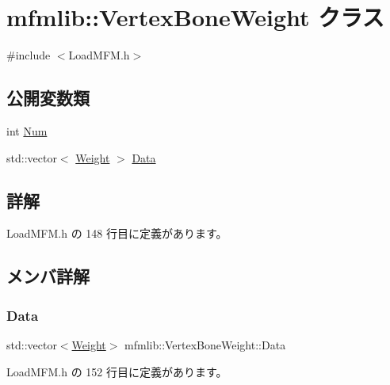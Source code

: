 \hypertarget{classmfmlib_1_1_vertex_bone_weight}{}\section{mfmlib\+:\+:Vertex\+Bone\+Weight クラス}
\label{classmfmlib_1_1_vertex_bone_weight}


{\ttfamily \#include $<$Load\+M\+F\+M.\+h$>$}

\subsection*{公開変数類}
\begin{DoxyCompactItemize}
\item 
int \mbox{\hyperlink{classmfmlib_1_1_vertex_bone_weight_ae5ef8b8e05724b82f358fa618cb0a9ef}{Num}}
\item 
std\+::vector$<$ \mbox{\hyperlink{structmfmlib_1_1_weight}{Weight}} $>$ \mbox{\hyperlink{classmfmlib_1_1_vertex_bone_weight_af4ad2362277d67a66908a5747ee17207}{Data}}
\end{DoxyCompactItemize}


\subsection{詳解}


 Load\+M\+F\+M.\+h の 148 行目に定義があります。



\subsection{メンバ詳解}
\mbox{\label{classmfmlib_1_1_vertex_bone_weight_af4ad2362277d67a66908a5747ee17207}} 
\subsubsection{\texorpdfstring{Data}{Data}}
{\footnotesize\ttfamily std\+::vector$<$\mbox{\hyperlink{structmfmlib_1_1_weight}{Weight}}$>$ mfmlib\+::\+Vertex\+Bone\+Weight\+::\+Data}



 Load\+M\+F\+M.\+h の 152 行目に定義があります。

